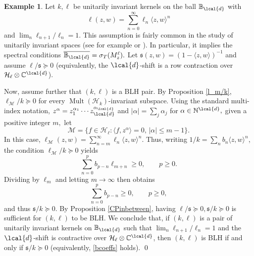 \documentclass[a4paper,reqno,index]{amsart}
\numberwithin{equation}{section}
\newcommand{\NN}{\mathbb{N}}
\newcommand{\Mult}{\operatorname{Mult}}
\newcommand{\cH}{\mathcal{H}}
\newcommand{\specT}{\sigma_T}  %
\newcommand{\ol}[1]{\overline{#1}}
\theoremstyle{definition}
\newtheorem{example}[theorem]{Example}
\begin{document}
\begin{example} \label{regularballex}
Let $k, \ell$ be unitarily  invariant kernels on the ball $\mathbb{B}_{\lcal{d}}$ with 
\[ \ell(z, w)=\sum_{n=0}^{\infty}\ell_{n}\langle z, w\rangle^{n}\]
and $\lim_n\ell_{n+1}/\ell_n=1$. This assumption is fairly common in the study of
unitarily invariant spaces (see for example \cite[Section 4]{GreeneRichtSund} or \cite[Proposition 8.5]{HartzIsomorphism}).
In particular, it implies the spectral conditions $\ol{\mathbb{B}_{\lcal{d}}}= \specT(M_z^\ell).$ Let $\mathfrak{s}(z,w)=(1-\langle z, w\rangle)^{-1}$ and assume $\ell/\mathfrak{s}\succeq 0$ (equivalently, the $\lcal{d}$-shift is a row contraction over $\mathcal{H}_{\ell}\otimes\mathbb{C}^{\lcal{d}}$). \par 
Now, assume further that $(k, \ell)$ is a BLH pair. By Proposition \ref{l_m/k}, $\ell_{\mathcal{M}}/k\succeq 0$ for every $\Mult(\mathcal{H}_k)$-invariant subspace.   Using the standard multi-index
notation, $z^{\alpha} = z_1^{\alpha_1} \cdots z_{\lcal{d}}^{\alpha_{\lcal{d}}}$ and $|\alpha| 
=\sum_j \alpha_j$ for $\alpha \in \NN^{\lcal{d}},$ given
a positive integer $m,$ let
\[
  \mathcal{M}=\{f\in \cH_\ell:  \langle f, z^{\alpha}\rangle =0, \, |\alpha|\le m-1\}. 
\] 
In this case, $\ell_{\mathcal{M}}(z,w)=\sum_{n=m}^{\infty}\ell_n\langle z, w\rangle^n.$ Thus, writing $1/k=\sum_n b_n\langle z, w\rangle^n$, the condition $\ell_{\mathcal{M}}/k \succeq 0$ yields 
\begin{equation*} 
\sum_{n=0}^p b_{p-n}\ell_{m+n}\ge 0,\qquad p\ge 0.
\end{equation*}
Dividing by $\ell_m$ and letting $m\to\infty$ then obtains
\begin{equation} \label{bcoeffs}
\sum_{n=0}^p b_{p-n}\ge 0,\qquad p\ge 0,
\end{equation}
and thus $\mathfrak{s}/k\succeq 0$. By Proposition \ref{CPinbetween}, having $\ell/\mathfrak{s}\succeq 0, \mathfrak{s}/k\succeq 0$ is sufficient for $(k, \ell)$ to be BLH. We conclude that, if $(k, \ell)$ is a pair of unitarily invariant kernels on 
$\mathbb{B}_{\lcal{d}}$ such that $\lim_n\ell_{n+1}/\ell_n=1$ and the $\lcal{d}$-shift  is contractive over $\mathcal{H}_{\ell}\otimes\mathbb{C}^{\lcal{d}}$, then $(k, \ell)$ is BLH if and only if $\mathfrak{s}/k\succeq 0$ (equivalently, \eqref{bcoeffs} holds).
\qed
\end{example}
\end{document}

